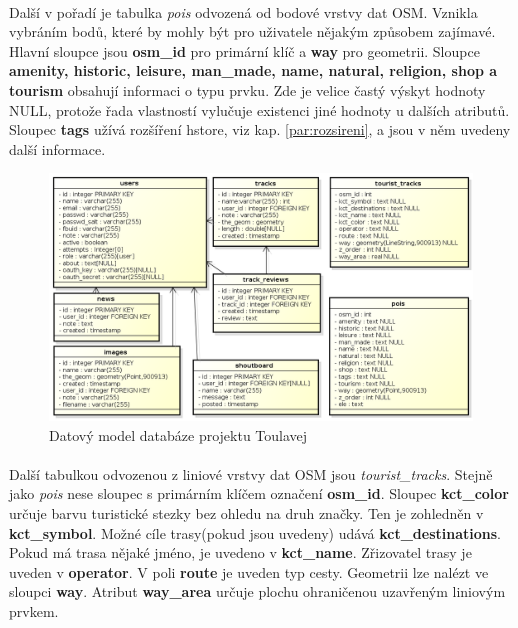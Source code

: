 \documentclass[11pt,a4paper,titlepage,oneside]{book}
\begin{document}
				\paragraph{}Další v pořadí je tabulka \textit{pois} odvozená od bodové vrstvy dat \ac{OSM}. Vznikla vybráním bodů, které by mohly být pro uživatele nějakým způsobem zajímavé. Hlavní sloupce jsou \textbf{osm\_id} pro primární klíč a \textbf{way} pro geometrii. Sloupce \textbf{amenity, historic, leisure, man\_made, name, natural, religion, shop a tourism} obsahují informaci o typu prvku. Zde je velice častý výskyt hodnoty NULL, protože řada vlastností vylučuje existenci jiné hodnoty u dalších atributů. Sloupec \textbf{tags} užívá rozšíření hstore, viz kap. \ref{par:rozsireni}, a jsou v něm uvedeny další informace.
		\begin{figure}[!h]
			\begin{center}
				\includegraphics[width=13cm]{obrazky/datovy_model.png}
				\caption{Datový model databáze projektu Toulavej}
				\label{fig:db}
			\end{center}
		\end{figure}
                        \paragraph{} Další tabulkou odvozenou z liniové vrstvy dat \ac{OSM} jsou \textit{tourist\_tracks}. Stejně jako \textit{pois} nese sloupec s primárním klíčem označení \textbf{osm\_id}. Sloupec \textbf{kct\_color} určuje barvu turistické stezky bez ohledu na druh značky. Ten je zohledněn v \textbf{kct\_symbol}. Možné cíle trasy(pokud jsou uvedeny) udává \textbf{kct\_destinations}. Pokud má trasa nějaké jméno, je uvedeno v \textbf{kct\_name}. Zřizovatel trasy je uveden v \textbf{operator}. V poli \textbf{route} je uveden typ cesty. Geometrii lze nalézt ve sloupci \textbf{way}. Atribut \textbf{way\_area} určuje plochu ohraničenou uzavřeným liniovým prvkem.
\end{document}
